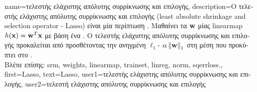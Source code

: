 {name={\foreignlanguage{greek}{τελεστής ελάχιστης απόλυτης συρρίκνωσης και επιλογής}}, 
	description={\foreignlanguage{greek}{Ο τελεστής ελάχιστης απόλυτης συρρίκνωσης και 
		επιλογής} 
		(least absolute shrinkage and selection operator - Lasso)
		\foreignlanguage{greek}{είναι μία περίπτωση} . \foreignlanguage{greek}{Μαθαίνει τα} 
		 ${\bf w}$ \foreignlanguage{greek}{μίας} \gls{linearmap} 
		$h({\bf x}) = {\bf w}^{T} {\bf x}$ \foreignlanguage{greek}{με βάση ένα} . 
		\foreignlanguage{greek}{Ο τελεστής ελάχιστης απόλυτης συρρίκνωσης και επιλογής προκαλείται από} 
		 \foreignlanguage{greek}{προσθέτοντας την ανηγμένη} $\ell_{1}$- 
		$\alpha \left\Vert {{\bf w}} \right\Vert_{1}$ \foreignlanguage{greek}{στη μέση}  
		\foreignlanguage{greek}{που προκύπτει στο} .\\
		\foreignlanguage{greek}{Βλέπε επίσης:} \gls{srm}, \gls{weights}, \gls{linearmap}, \gls{trainset}, \gls{linreg}, \gls{norm}, \gls{sqerrloss}.},
	first={Lasso},
	text={Lasso},
	user1={\foreignlanguage{greek}{τελεστής ελάχιστης απόλυτης συρρίκνωσης και επιλογής}}, %
  	user2={\foreignlanguage{greek}{τελεστή ελάχιστης απόλυτης συρρίκνωσης και επιλογής}} %
}


